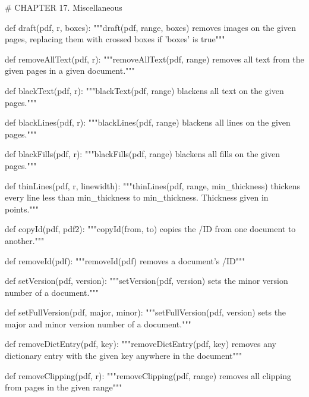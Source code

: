 # CHAPTER 17. Miscellaneous

def draft(pdf, r, boxes):
    """draft(pdf, range, boxes) removes images on the given pages, replacing
    them with crossed boxes if 'boxes' is true"""

def removeAllText(pdf, r):
    """removeAllText(pdf, range) removes all text from the given pages in a
    given document."""

def blackText(pdf, r):
    """blackText(pdf, range) blackens all text on the given pages."""

def blackLines(pdf, r):
    """blackLines(pdf, range) blackens all lines on the given pages."""

def blackFills(pdf, r):
    """blackFills(pdf, range) blackens all fills on the given pages."""

def thinLines(pdf, r, linewidth):
    """thinLines(pdf, range, min_thickness) thickens every line less than
    min_thickness to min_thickness. Thickness given in points."""

def copyId(pdf, pdf2):
    """copyId(from, to) copies the /ID from one document to another."""

def removeId(pdf):
    """removeId(pdf) removes a document's /ID"""

def setVersion(pdf, version):
    """setVersion(pdf, version) sets the minor version number of a document."""

def setFullVersion(pdf, major, minor):
    """setFullVersion(pdf, version) sets the major and minor version number of
    a document."""

def removeDictEntry(pdf, key):
    """removeDictEntry(pdf, key) removes any dictionary entry with the given
    key anywhere in the document"""

def removeClipping(pdf, r):
    """removeClipping(pdf, range) removes all clipping from pages in the given
    range"""
